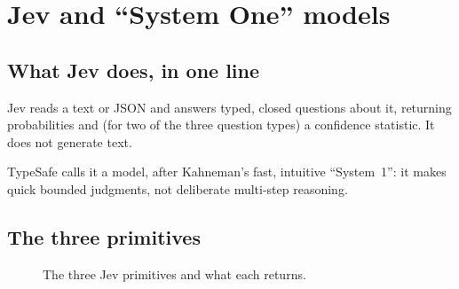 \chapter{Jev and ``System One'' models}
\label{ch:jev}

\section{What Jev does, in one line}
\label{sec:jev-oneline}

Jev reads a text or JSON  and answers typed, closed questions about it,
returning probabilities and (for two of the three question types) a confidence
statistic. It does not generate text.\DOC{}~\citep{typesafe_systemone}

TypeSafe calls it a  model, after Kahneman's fast, intuitive ``System~1'':
it makes quick bounded judgments, not deliberate multi-step reasoning.

\section{The three primitives}

\begin{figure}[h]\centering
{}
\caption{The three Jev primitives and what each returns.~\citep{typesafe_primitives}}
\label{fig:primitives}
\end{figure}

